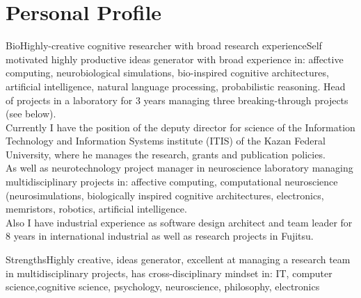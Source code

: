 \documentclass{moderncv}
\begin{document}

\makecvtitle

 
\section{Personal Profile}

\cventry
    {Bio}{Highly-creative cognitive researcher with broad research experience}{}{}{}{Self motivated highly productive ideas generator with broad experience in: affective computing, neurobiological simulations, bio-inspired cognitive architectures, artificial intelligence, natural language processing, probabilistic reasoning. Head of projects in a laboratory for 3 years managing three breaking-through projects (see below).\\
      Currently I have the position of the deputy director for science of the Information Technology and Information Systems institute (ITIS) of the Kazan Federal University, where he manages the research, grants and publication policies.\\
      As well as neurotechnology project manager in neuroscience laboratory managing multidisciplinary projects in: affective computing, computational neuroscience (neurosimulations, biologically inspired cognitive architectures, electronics, memristors, robotics, artificial intelligence.\\
      Also I have industrial experience as software design architect and team leader for 8 years in international industrial as well as research projects in Fujitsu.}

\cvitem
{Strengths}{Highly creative, ideas generator, excellent at managing a research team in multidisciplinary projects, has cross-disciplinary mindset in: IT, computer science,cognitive science, psychology, neuroscience, philosophy, electronics}
\end{document}
